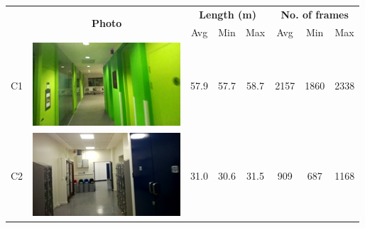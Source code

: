 \begin{table}[ht]


\begin{center}

\centering
    \begin{tabular}{l c c c c c c c}
    \hline
    & \multirow{2}{*}{\bf{Photo}} & \multicolumn{3}{c}{\bf{Length (m)}} & \multicolumn{3}{c}{\bf{No. of frames}}  \\ \cline{3-8}
             & ~     & Avg    & Min   & Max   & Avg              & Min  & Max  \\ \hline
    C1       & \begin{minipage}{.2\textwidth}
      			\includegraphics[width=\linewidth]{./gfx/Chapter04/table/1.jpg}
			   \end{minipage}
			        & 57.9  & 57.7 & 58.7 & 2157         & 1860 & 2338 \\ \hline
    C2       & \begin{minipage}{.2\textwidth}
      			\includegraphics[width=\linewidth]{./gfx/Chapter04/table/2.jpg}
			   \end{minipage}
         & 31.0  & 30.6 & 31.5 & 909          & 687  & 1168 \\ \hline

\end{tabular}
\end{center}
\end{table}
